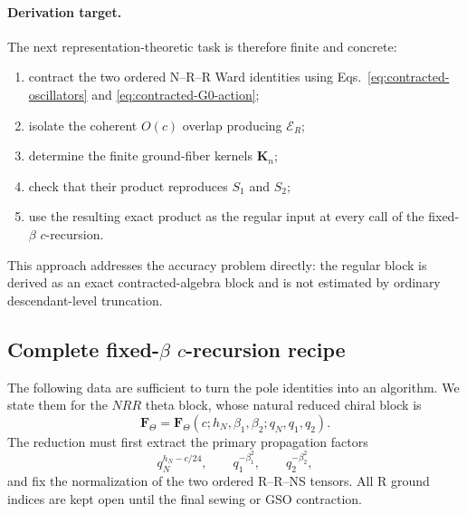 \documentclass[11pt]{article}
\begin{document}
\paragraph{Derivation target.}
The next representation-theoretic task is therefore finite and concrete:
\begin{enumerate}
 \item contract the two ordered N--R--R Ward identities using
       Eqs.~\eqref{eq:contracted-oscillators} and
       \eqref{eq:contracted-G0-action};

 \item isolate the coherent \(O(c)\) overlap producing
       \(\mathcal E_R\);

 \item determine the finite ground-fiber kernels \(\mathbf K_n\);

 \item check that their product reproduces \(S_1\) and \(S_2\);

 \item use the resulting exact product as the regular input at every call
       of the fixed-\(\beta\) \(c\)-recursion.
\end{enumerate}
This approach addresses the accuracy problem directly: the regular block
is derived as an exact contracted-algebra block and is not estimated by
ordinary descendant-level truncation.

\subsection{\texorpdfstring{Complete fixed-\(\beta\) \(c\)-recursion
recipe}{Complete fixed-beta c-recursion recipe}}
\label{sec:complete-fixed-beta-recipe}

The following data are sufficient to turn the pole identities into an
algorithm.  We state them for the \(NRR\) theta block, whose natural reduced
chiral block is
\begin{equation}
 \mathbf F_\Theta
 =
 \mathbf F_\Theta
 \left(c;h_N,\beta_1,\beta_2;q_N,q_1,q_2\right).
 \label{eq:nrr-natural-variables}
\end{equation}
The reduction must first extract the primary propagation factors
\begin{equation}
 q_N^{h_N-c/24},
 \qquad q_1^{-\beta_1^2},
 \qquad q_2^{-\beta_2^2},
 \label{eq:nrr-primary-prefactors}
\end{equation}
and fix the normalization of the two ordered R--R--NS tensors.  All R
ground indices are kept open until the final sewing or GSO contraction.
\end{document}
